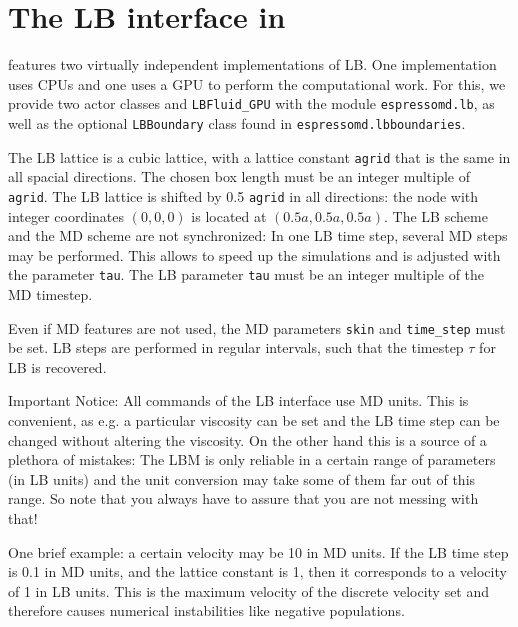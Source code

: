 

\section{The LB interface in \ES{}}
\ES{} features two virtually independent implementations of LB. One implementation
uses CPUs and one uses a GPU to perform the computational work. For this, we
provide two actor classes  and \texttt{LBFluid\_GPU} with the
module \texttt{espressomd.lb}, as well as the optional \texttt{LBBoundary} class
found in \texttt{espressomd.lbboundaries}.

The LB lattice is a cubic lattice, with a lattice constant \texttt{agrid} that
is the same in all spacial directions. The chosen box length must be an integer multiple
of \texttt{agrid}. The LB lattice is shifted by 0.5 \texttt{agrid} in all directions: the node
with integer coordinates $\left(0,0,0\right)$ is located at
$\left(0.5a,0.5a,0.5a\right)$.
The LB scheme and the MD scheme are not synchronized: In one
LB time step, several MD steps may be performed. This allows to speed
up the simulations and is adjusted with the parameter \texttt{tau}.
The LB parameter \texttt{tau} must be an integer multiple of the MD timestep.

Even if MD features are not used, the MD parameters \texttt{skin} and
\texttt{time\_step} must be set. LB steps are performed 
in regular intervals, such that the timestep $\tau$ for LB is recovered. 




Important Notice: All commands of the LB interface use
MD units. This is convenient, as e.g. a particular 
viscosity can be set and the LB time step can be changed without
altering the viscosity. On the other hand this is a source
of a plethora of mistakes: The LBM is only reliable in a certain 
range of parameters (in LB units) and the unit conversion
may take some of them far out of this range. So note that you always
have to assure that you are not messing with that!

One brief example: a certain velocity may be 10 in MD units.
If the LB time step is 0.1 in MD units, and the lattice constant
is 1, then it corresponds to a velocity of 1 in LB units. 
This is the maximum velocity of the discrete velocity set and therefore
causes numerical instabilities like negative populations.

